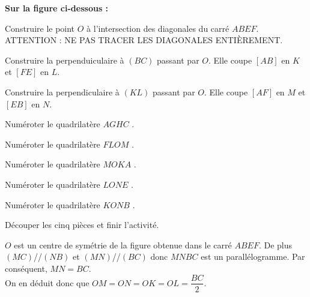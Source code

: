 \begin{activite}
    \pagebreak
    \vspace*{-15mm}
    \textbf{Sur la figure ci-dessous :}
    \begin{itemize}
        \item Construire le point $O$ à l'intersection des diagonales du carré $ABEF$.\\ ATTENTION : NE PAS TRACER LES DIAGONALES ENTIÈREMENT.
        \item Construire la perpenduiculaire à $(BC)$ passant par $O$. Elle coupe $[AB]$ en $K$ et $[FE]$ en $L$.
        \item Construire la perpendiculaire à $(KL)$ passant par $O$. Elle coupe $[AF]$ en $M$ et $[EB]$ en $N$.
        \begin{minipage}{0.5\linewidth}
        \item Numéroter le quadrilatère $AGHC$ .
        \item Numéroter le quadrilatère $FLOM$ .
        \item Numéroter le quadrilatère $MOKA$ .
        \item Numéroter le quadrilatère $LONE$ .
        \item Numéroter le quadrilatère $KONB$ .
        \item Découper les cinq pièces et finir l'activité.
        \end{minipage}
        \begin{minipage}{0.5\linewidth}
        \end{minipage}
    \end{itemize}
    
    \begin{remarque}
        $O$ est un centre de symétrie de la figure obtenue dans le carré $ABEF$. De plus $(MC)$//$(NB)$ et $(MN)$//$(BC)$ donc $MNBC$ est un parallélogramme. 
        Par conséquent, $MN=BC$.\\ On en déduit donc que $OM=ON=OK=OL=\dfrac{BC}{2}$.
    \end{remarque}    
\end{activite}